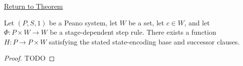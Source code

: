 \newpage
{}
\label{prf:general-recursion-by-state-encoding}

\begin{remark*}[Return]
\hyperref[thm:general-recursion-by-state-encoding]{Return to Theorem}
\end{remark*}

\begin{theorem*}
Let $(P,S,1)$ be a Peano system, let $W$ be a set, let $c\in W$, and let
$\Phi:P\times W\to W$ be a stage-dependent step rule. There exists a function
$H:P\to P\times W$ satisfying the stated state-encoding base and successor
clauses.
\end{theorem*}

\begin{proof}
TODO
\end{proof}
